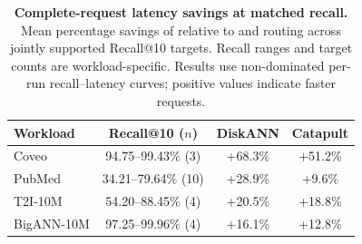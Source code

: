 \begin{table}[t]
\centering
\caption{\textbf{Complete-request latency savings at matched recall.} Mean percentage savings of \sys relative to \DiskANN and \CatapultDB routing across jointly supported Recall@10 targets. Recall ranges and target counts are workload-specific. Results use non-dominated per-run recall--latency curves; positive values indicate faster requests.}
\label{tab:eval-service-latency}
\small
\setlength{\tabcolsep}{2pt}
\begin{tabular}{@{}lccc@{}}
\toprule
Workload & Recall@10 ($n$) & DiskANN & Catapult \\
\midrule
Coveo & 94.75--99.43\% (3) & +68.3\% & +51.2\% \\
PubMed & 34.21--79.64\% (10) & +28.9\% & +9.6\% \\
T2I-10M & 54.20--88.45\% (4) & +20.5\% & +18.8\% \\
BigANN-10M & 97.25--99.96\% (4) & +16.1\% & +12.8\% \\
\bottomrule
\end{tabular}
\end{table}
